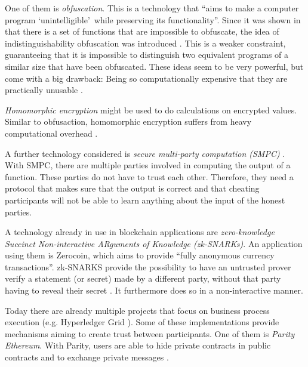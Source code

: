 \documentclass[runningheads]{llncs}
\newcommand{\comment}[1]{}
\newcommand{\quotel}{``}
\newcommand{\quoter}{''}
\begin{document}
One of them is \textit{obfuscation}. This is a technology that \quotel aims to make a computer program `unintelligible'\ while preserving its functionality\quoter  \cite{garg2016candidate}. Since it was shown in that there is a set of functions that are impossible to obfuscate, the idea of indistinguishability obfuscation  was introduced \cite{barak2001possibility,barak2012possibility}. This is a weaker constraint, guaranteeing that it is impossible to distinguish two equivalent programs of a similar size that have been obfuscated. These ideas seem to be very powerful, but come with a big drawback: Being so computationally expensive that they are practically unusable \cite{banescu2015idea}.

\textit{Homomorphic encryption} might be used to do calculations on encrypted values. Similar to obfusaction, homomorphic encryption suffers from heavy computational overhead \cite{gentry2010computing}.


A further technology considered is \textit{secure multi-party computation (SMPC)} \cite{orlandi2011multiparty}. With SMPC, there are multiple parties involved in computing the output of a function. These parties do not have to trust each other. Therefore, they need a protocol that makes sure that the output is correct and that cheating participants will not be able to learn anything about the input of the honest parties. 


A technology already in use in blockchain applications are \textit{zero-knowledge Succinct Non-interactive ARguments of Knowledge (zk-SNARKs)}. An application using them is Zerocoin, which aims to provide  \quotel fully anonymous currency transactions\quoter  \cite{miers2013zerocoin}. zk-SNARKS provide the possibility to have an untrusted prover verify a statement (or secret) made by a different party, without that party having to reveal their secret \cite{ben2013snarks}. It furthermore does so in a non-interactive manner. 

Today there are already multiple projects that focus on business process execution (e.g. Hyperledger Grid \cite{hyperledger}). Some of these implementations provide mechanisms aiming to create trust between participants. One of them is \textit{Parity Ethereum}. With Parity, users are able to hide private contracts in public contracts and to exchange private messages \cite{parity}.

\comment{
However for private contract execution Parity is relying on validators,  \quotel  account[s] that can allow a private contract’s state [to] change\quoter  \cite{parity}. In our understanding this makes Parity insufficient for untrusted business execution, since, like private blockchains, it requires trust in one or multiple nodes. 
}
\end{document}
